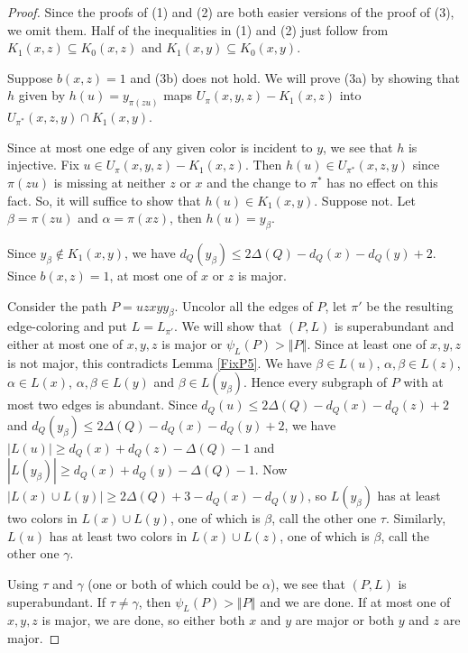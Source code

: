\documentclass[12pt,reqno]{amsart}
\theoremstyle{plain}
\theoremstyle{definition}
\theoremstyle{remark}
\newcommand{\card}[1]{\left|#1\right|}
\newcommand{\size}[1]{\left\Vert#1\right\Vert}
\begin{document}
\begin{proof}
Since the proofs of (1) and (2) are both easier versions of the proof of (3), we omit them.  Half of the inequalities in (1) and (2) just follow from $K_1(x, z) \subseteq K_0(x, z)$ and $K_1(x, y) \subseteq K_0(x, y)$.

Suppose $b(x, z) = 1$ and (3b) does not hold.  We will prove (3a) by showing that $h$ given by $h(u) = y_{\pi(zu)}$ maps $U_\pi(x,y,z) - K_1(x, z)$ into $U_{\pi^*}(x, z, y) \cap K_1(x, y)$. 

Since at most one edge of any given color is incident to $y$, we see that $h$ is injective. Fix $u \in U_\pi(x,y,z) - K_1(x, z)$.  Then $h(u) \in U_{\pi^*}(x, z, y)$ since $\pi(zu)$ is missing at neither $z$ or $x$ and the change to $\pi^*$ has no effect on this fact.  So, it will suffice to show that $h(u) \in K_1(x, y)$.  Suppose not.  Let $\beta = \pi(zu)$ and $\alpha = \pi(xz)$, then $h(u) = y_\beta$.

Since $y_\beta \not \in K_1(x,y)$, we have $d_Q(y_\beta) \le 2\Delta(Q) - d_Q(x) - d_Q(y) + 2$.  Since $b(x, z) = 1$, at most one of $x$ or $z$ is major. 

Consider the path $P = uzxyy_\beta$.  Uncolor all the edges of $P$, let $\pi'$ be the resulting edge-coloring and put $L = L_{\pi'}$.  We will show that $(P, L)$ is superabundant and either at most one of $x,y,z$ is major or $\psi_L(P) > \size{P}$.  Since at least one of $x, y, z$ is not major, this contradicts Lemma \ref{FixP5}.  We have $\beta \in L(u)$, $\alpha, \beta \in L(z)$, $\alpha \in L(x)$, $\alpha, \beta \in L(y)$ and $\beta \in L(y_\beta)$.  Hence every subgraph of $P$ with at most two edges is abundant.  Since $d_Q(u) \le 2\Delta(Q) - d_Q(x) - d_Q(z) + 2$ and $d_Q(y_\beta) \le 2\Delta(Q) - d_Q(x) - d_Q(y) + 2$, we have $\card{L(u)} \ge d_Q(x) + d_Q(z) - \Delta(Q) - 1$ and $\card{L(y_\beta)} \ge d_Q(x) + d_Q(y) - \Delta(Q) - 1$.  Now $\card{L(x) \cup L(y)} \ge 2\Delta(Q) + 3 - d_Q(x) - d_Q(y)$, so $L(y_\beta)$ has at least two colors in $L(x) \cup L(y)$, one of which is $\beta$, call the other one $\tau$.  Similarly, $L(u)$ has at least two colors in $L(x) \cup L(z)$, one of which is $\beta$, call the other one $\gamma$. 

Using $\tau$ and $\gamma$ (one or both of which could be $\alpha$), we see that $(P, L)$ is superabundant.  If $\tau \ne \gamma$, then $\psi_L(P) > \size{P}$ and we are done.  If at most one of $x,y,z$ is major, we are done, so either both $x$ and $y$ are major or both $y$ and $z$ are major.  


\end{proof}
\end{document}
